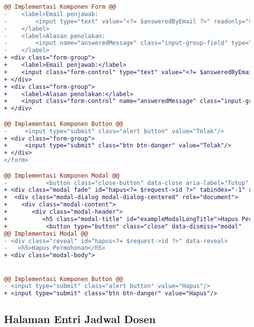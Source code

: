\begin{lstlisting}[language=diff, label=Entri, basicstyle=\ttfamily, frame=single,
columns=fullflexible, keepspaces=true, breaklines=true]
@@ Implementasi Komponen Form @@
-    <label>Email penjawab:
-        <input type="text" value="<?= $answeredByEmail ?>" readonly="true"/>
-    </label>
-    <label>Alasan penolakan:
-        <input name="answeredMessage" class="input-group-field" type="text" required/>
-    </label>
+ <div class="form-group">
+    <label>Email penjawab:</label>
+    <input class="form-control" type="text" value="<?= $answeredByEmail ?>" readonly="true"/>
+ </div>
+ <div class="form-group">
+    <label>Alasan penolakan:</label>
+    <input class="form-control" name="answeredMessage" class="input-group-field" type="text" required/>
+ </div>

@@ Implementasi Komponen Button @@                                       
-     <input type="submit" class="alert button" value="Tolak"/>
+ <div class="form-group">
+     <input type="submit" class="btn btn-danger" value="Tolak"/>
+ </div>
</form>

@@ Implementasi Komponen Modal @@
-    	    <button class="close-button" data-close aria-label="Tutup" type="button">
+ <div class="modal fade" id="hapus<?= $request->id ?>" tabindex="-1" role="dialog" aria-hidden="true">
+  <div class="modal-dialog modal-dialog-centered" role="document">
+    <div class="modal-content">
+       <div class="modal-header">
+          <h5 class="modal-title" id="exampleModalLongTitle">Hapus Permohonan #<?= $request->id ?></h5>
+           <button type="button" class="close" data-dismiss="modal" 
@@ Implementasi Modal @@
- <div class="reveal" id="hapus<?= $request->id ?>" data-reveal>
-	<h5>Hapus Permohonan</h5>
+ <div class="modal-body">


@@ Implementasi Komponen Button @@
- <input type="submit" class="alert button" value="Hapus"/>
+ <input type="submit" class="btn btn-danger" value="Hapus"/>
\end{lstlisting}

\subsection{Halaman Entri Jadwal Dosen}

